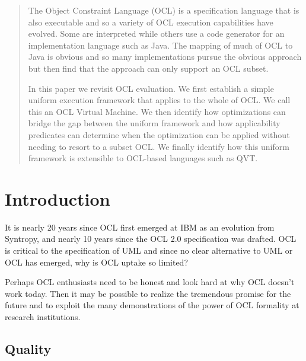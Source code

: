 \documentclass{sig-alternate}
\begin{document}
\maketitle
\begin{abstract}
The Object Constraint Language (OCL) is a specification language that is also executable
and so a variety of OCL execution capabilities have evolved. Some are interpreted while
others use a code generator for an implementation language such as Java. The mapping
of much of OCL to Java is obvious and so many implementations pursue the obvious approach
but then find that the approach can only support an OCL subset.

In this paper we revisit OCL evaluation. We first establish a simple uniform execution framework
that applies to the whole of OCL. We call this an OCL Virtual Machine.
We then identify how optimizations can bridge the gap between
the uniform framework and how applicability predicates can determine when the optimization can
be applied without needing to resort to a subset OCL. We finally identify how this uniform
framework is extensible to OCL-based languages such as QVT.
\end{abstract}




\section{Introduction}
It is nearly 20 years since OCL first emerged at IBM as an evolution from Syntropy, and nearly 10 years since the OCL 2.0 specification was drafted\cite{OCL-2.0-draft}. OCL is critical to the specification of UML and since no clear alternative to UML or OCL has emerged, why is OCL uptake so limited?

Perhaps OCL enthusiasts need to be honest and look hard at why OCL doesn't work today.
Then it may be possible to realize the tremendous promise for the future and to exploit the many
demonstrations of the power of OCL formality at research institutions.

\subsection{Quality}
\end{document}
